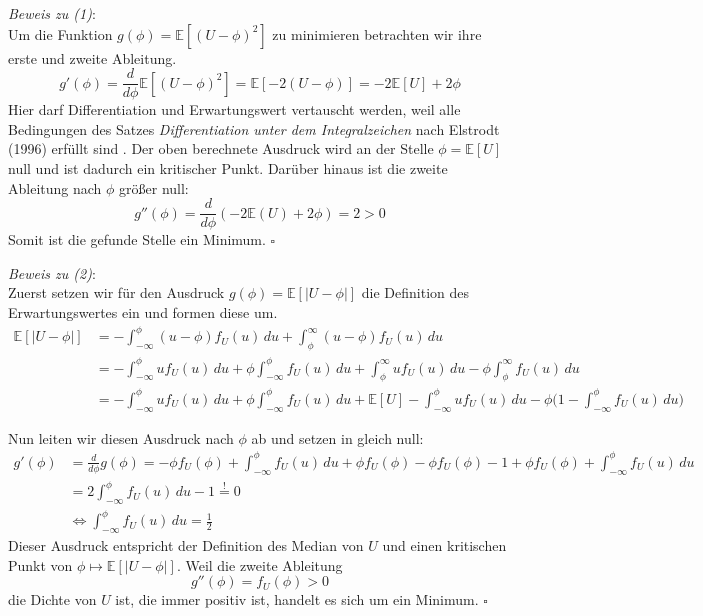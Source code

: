 \textit{Beweis zu (1)}: \\
Um die Funktion $g(\phi) = \mathbb{E}[(U - \phi)^2]$ zu minimieren betrachten wir ihre erste und zweite Ableitung.
$$ g'(\phi) = \frac{d}{d\phi}\mathbb{E}[(U-\phi)^2] = \mathbb{E}[-2(U-\phi)] = -2\mathbb{E}[U] + 2\phi$$
Hier darf Differentiation und Erwartungswert vertauscht werden, weil alle Bedingungen des Satzes \textit{Differentiation unter dem Integralzeichen} 
nach Elstrodt (1996) erf\"ullt sind \cite[Kapitel 4, Satz 5.7]{elstrodt}.
Der oben berechnete Ausdruck wird an der Stelle $\phi = \mathbb{E}[U]$ null und ist dadurch ein kritischer Punkt. Dar\"uber hinaus ist die zweite 
Ableitung nach $\phi$ gr\"o{\ss}er null:
$$g''(\phi) = \frac{d}{d\phi}(-2\mathbb{E}(U)+2\phi) = 2 > 0$$
Somit ist die gefunde Stelle ein Minimum. $\square$


\textit{Beweis zu (2)}: \\
Zuerst setzen wir f\"ur den Ausdruck $g(\phi) = \mathbb{E}[|U-\phi|]$ die Definition des Erwartungswertes ein und formen diese um.
\begin{equation*}
\begin{split}
  \mathbb{E}[|U-\phi|]  & = -\int_{-\infty}^{\phi}(u-\phi)f_U(u)  \,du + \int_{\phi}^{\infty}(u-\phi)f_U(u)  \,du \\\
 & = - \int_{-\infty}^{\phi}uf_U(u)  \,du + \phi \int_{-\infty}^{\phi}f_U(u)  \,du + \int_{\phi}^{\infty}uf_U(u)  \,du -\phi \int_{\phi}^{\infty}f_U(u)  \,du \\\
 & = - \int_{-\infty}^{\phi}uf_U(u) \,du + \phi \int_{-\infty}^{\phi}f_U(u) \,du + \mathbb{E}[U] - \int_{-\infty}^{\phi}uf_U(u) \,du - \phi \bigl(1 - \int_{-\infty}^{\phi}f_U(u) \,du \bigr)
\end{split}
\end{equation*}

Nun leiten wir diesen Ausdruck nach $\phi$ ab und setzen in gleich null:
\begin{equation*}
  \begin{split}
    g'(\phi) & = \frac{d}{d\phi}g(\phi) = -\phi f_U(\phi) + \int_{-\infty}^{\phi}f_U(u) \,du + \phi f_U(\phi) - \phi f_U(\phi) - 1 + \phi f_U(\phi) + \int_{-\infty}^{\phi}f_U(u) \,du \\\
    & = 2\int_{-\infty}^{\phi}f_U(u) \,du - 1 \overset{!}{=} 0 \\\
    & \Leftrightarrow \int_{-\infty}^{\phi}f_U(u) \,du = \frac{1}{2}
  \end{split}
\end{equation*}
Dieser Ausdruck entspricht der Definition des Median von $U$ und einen kritischen Punkt von $\phi \mapsto \mathbb{E}[|U - \phi|]$. Weil die zweite Ableitung 
$$ g''(\phi) = f_U(\phi) > 0 $$
die Dichte von $U$ ist, die immer positiv ist, handelt es sich um ein Minimum. $\square$



